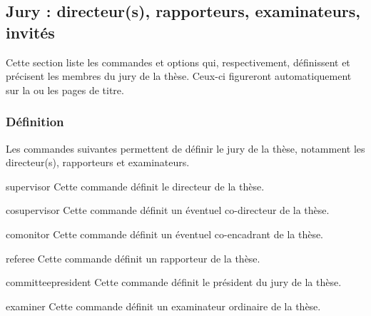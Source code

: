\subsection{Jury : directeur(s), rapporteurs, examinateurs, invités}\label{sec:jury}

Cette section liste les commandes et options qui, respectivement,
définissent et précisent les membres du jury de la thèse. Ceux-ci
figureront automatiquement sur la ou les pages de titre.

\subsubsection{Définition}\label{sec:definition-jury}

Les commandes suivantes permettent de définir le jury de la thèse,
notamment les directeur(s), rapporteurs et examinateurs.
%
\begin{docCommand}[doc description=\mandatory]{supervisor}{}
  Cette commande définit le directeur de la thèse.
\end{docCommand}

\begin{docCommand}{cosupervisor}{}
  Cette commande définit un éventuel co-directeur de la thèse.
\end{docCommand}

\begin{docCommand}{comonitor}{}
  Cette commande définit un éventuel co-encadrant de la thèse.
\end{docCommand}

\begin{docCommand}{referee}{}
  Cette commande définit un rapporteur de la thèse.
\end{docCommand}

\begin{docCommand}{committeepresident}{}
  Cette commande définit le président du jury de la thèse.
\end{docCommand}

\begin{docCommand}{examiner}{}
  Cette commande définit un examinateur ordinaire de la thèse.
\end{docCommand}

